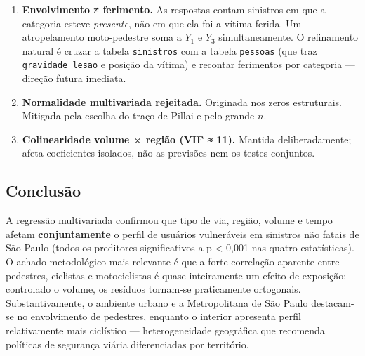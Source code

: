 \documentclass[
  11pt,
]{article}
\begin{document}
\begin{enumerate}
\def\labelenumi{\arabic{enumi}.}
\item
  \textbf{Envolvimento ≠ ferimento.} As respostas contam sinistros em
  que a categoria esteve \emph{presente}, não em que ela foi a vítima
  ferida. Um atropelamento moto-pedestre soma a \(Y_1\) e \(Y_3\)
  simultaneamente. O refinamento natural é cruzar a tabela
  \texttt{sinistros} com a tabela \texttt{pessoas} (que traz
  \texttt{gravidade\_lesao} e posição da vítima) e recontar ferimentos
  por categoria --- direção futura imediata.
\item
  \textbf{Normalidade multivariada rejeitada.} Originada nos zeros
  estruturais. Mitigada pela escolha do traço de Pillai e pelo grande
  \(n\).
\item
  \textbf{Colinearidade volume × região (VIF ≈ 11).} Mantida
  deliberadamente; afeta coeficientes isolados, não as previsões nem os
  testes conjuntos.
\end{enumerate}

\subsection{Conclusão}\label{conclusuxe3o}

A regressão multivariada confirmou que tipo de via, região, volume e
tempo afetam \textbf{conjuntamente} o perfil de usuários vulneráveis em
sinistros não fatais de São Paulo (todos os preditores significativos a
p \textless{} 0,001 nas quatro estatísticas). O achado metodológico mais
relevante é que a forte correlação aparente entre pedestres, ciclistas e
motociclistas é quase inteiramente um efeito de exposição: controlado o
volume, os resíduos tornam-se praticamente ortogonais. Substantivamente,
o ambiente urbano e a Metropolitana de São Paulo destacam-se no
envolvimento de pedestres, enquanto o interior apresenta perfil
relativamente mais ciclístico --- heterogeneidade geográfica que
recomenda políticas de segurança viária diferenciadas por território.
\end{document}
